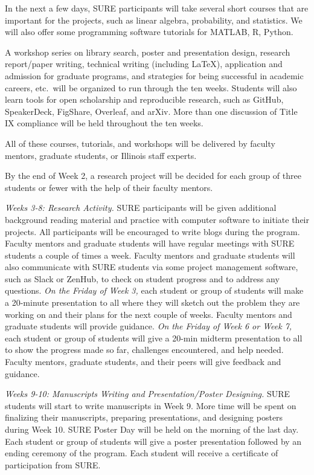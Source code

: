 \documentclass[11pt]{NSFamsart}
\begin{document}
In the next a few days,
SURE participants will take several short courses that are important for the projects, such as linear algebra, probability, and statistics. We will also offer some programming software tutorials for MATLAB, R, Python.

A workshop series on library search, poster and presentation design,
research report/paper writing, technical writing (including LaTeX), application and admission for
graduate programs, and strategies for being successful in academic careers, etc.\ will be organized to run through the ten weeks.  Students will also learn tools for open scholarship and reproducible research, such as GitHub, SpeakerDeck, FigShare, Overleaf, and arXiv.   More than one discussion of Title IX compliance will be held throughout the ten weeks.  

All of these courses, tutorials, and workshops will be delivered by faculty mentors, graduate students, or Illinois staff experts.

By the end of Week 2, a research project will be decided for each group of three students or fewer with the help of their faculty mentors.

\noindent \emph{Weeks 3-8: Research Activity.}
SURE participants will be given additional background
reading material and practice with computer software to initiate their projects. All participants will be encouraged to write blogs \cite{Hig21a} during the program. Faculty mentors and graduate
students will have regular meetings with SURE students a couple of times a week. Faculty mentors and graduate students will also communicate with SURE students via some project management software, such as Slack or ZenHub, to check on student progress and to address any questions. 
\emph{On the Friday of Week 3,}
each student or group of students will make a 20-minute presentation to all where they will sketch out the problem they are working on and their plans for the next couple of weeks. Faculty mentors and
graduate students will provide guidance.
\emph{On the Friday of Week 6 or Week 7,}
each student or group of students will give a 20-min midterm presentation to all to show the progress made so far, challenges encountered, and help needed. Faculty mentors,
graduate students, and their peers will give feedback and guidance.

\noindent \emph{Weeks 9-10: Manuscripts Writing and Presentation/Poster Designing.} SURE students will start to
write manuscripts in Week 9. More time will be spent on finalizing their manuscripts, preparing presentations, and designing posters during Week 10. SURE Poster Day will be held on the morning of the last day. Each student or group of students will give a poster presentation followed by an ending ceremony of the program. Each student will receive a certificate of participation from  SURE.
\end{document}
